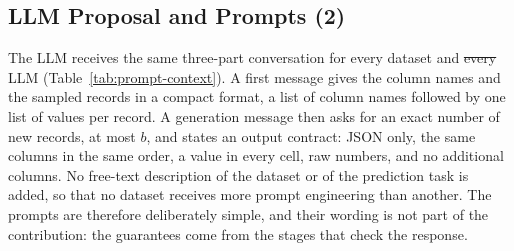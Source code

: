 \documentclass[conference]{IEEEtran}
\providecommand{\DIFdeltex}[1]{{\protect\color{red}\sout{#1}}}                      %
\providecommand{\DIFdelbegin}{} %
\providecommand{\DIFdelend}{} %
\providecommand{\DIFdel}[1]{\texorpdfstring{\DIFdeltex{#1}}{}} %
\newcommand{\DIFscaledelfig}{0.5}
\newlength{\DIFdelgraphicswidth} %
\newlength{\DIFdelgraphicsheight} %
\newcommand{\DIFdelincludegraphics}[2][]{%
\sbox{\DIFdelgraphicsbox}{\DIFOincludegraphics[#1]{#2}}%
\settoboxwidth{\DIFdelgraphicswidth}{\DIFdelgraphicsbox} %
\settoboxtotalheight{\DIFdelgraphicsheight}{\DIFdelgraphicsbox} %
\scalebox{\DIFscaledelfig}{%
\parbox[b]{\DIFdelgraphicswidth}{\usebox{\DIFdelgraphicsbox}\\[-\baselineskip] \rule{\DIFdelgraphicswidth}{0em}}\llap{\resizebox{\DIFdelgraphicswidth}{\DIFdelgraphicsheight}{%
\setlength{\unitlength}{\DIFdelgraphicswidth}%
\begin{picture}(1,1)%
\thicklines\linethickness{2pt} %
{\color[rgb]{1,0,0}\put(0,0){\framebox(1,1){}}}%
{\color[rgb]{1,0,0}\put(0,0){\line( 1,1){1}}}%
{\color[rgb]{1,0,0}\put(0,1){\line(1,-1){1}}}%
\end{picture}%
}\hspace*{3pt}}} %
} %
\DeclareRobustCommand{\DIFdelbegin}{\DIFOdelbegin \let\includegraphics\DIFdelincludegraphics} %
\DeclareRobustCommand{\DIFdelend}{\DIFOaddend \let\includegraphics\DIFOincludegraphics} %
\begin{document}
\subsection{LLM Proposal and Prompts (2)}
The LLM receives the same three-part conversation for every dataset and \DIFdelbegin \DIFdel{every }\DIFdelend LLM (Table~\ref{tab:prompt-context}). A first message gives the column names and the sampled records in a compact format, a list of column names followed by one list of values per record. A generation message then asks for an exact number of new records, at most $b$, and states an output contract: JSON only, the same columns in the same order, a value in every cell, raw numbers, and no additional columns. No free-text description of the dataset or of the prediction task is added, so that no dataset receives more prompt engineering than another. The prompts are therefore deliberately simple, and their wording is not part of the contribution: the guarantees come from the stages that check the response.
\end{document}

